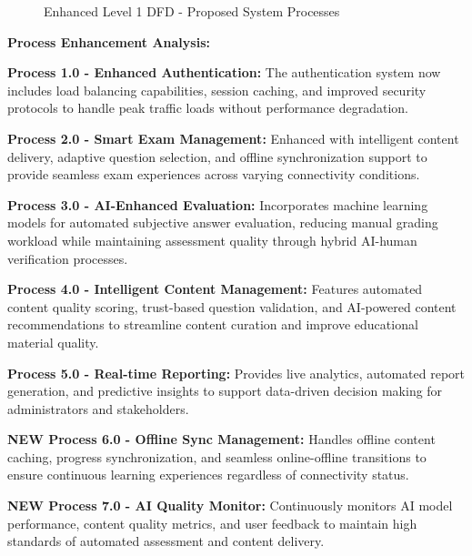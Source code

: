 \documentclass[12pt,a4paper,oneside]{book}
\begin{document}
\begin{figure}[H]
{
    }
    \caption{Enhanced Level 1 DFD - Proposed System Processes}
\end{figure}

\textbf{Process Enhancement Analysis:}

\textbf{Process 1.0 - Enhanced Authentication:} The authentication system now includes load balancing capabilities, session caching, and improved security protocols to handle peak traffic loads without performance degradation.

\textbf{Process 2.0 - Smart Exam Management:} Enhanced with intelligent content delivery, adaptive question selection, and offline synchronization support to provide seamless exam experiences across varying connectivity conditions.

\textbf{Process 3.0 - AI-Enhanced Evaluation:} Incorporates machine learning models for automated subjective answer evaluation, reducing manual grading workload while maintaining assessment quality through hybrid AI-human verification processes.

\textbf{Process 4.0 - Intelligent Content Management:} Features automated content quality scoring, trust-based question validation, and AI-powered content recommendations to streamline content curation and improve educational material quality.

\textbf{Process 5.0 - Real-time Reporting:} Provides live analytics, automated report generation, and predictive insights to support data-driven decision making for administrators and stakeholders.

\textbf{NEW Process 6.0 - Offline Sync Management:} Handles offline content caching, progress synchronization, and seamless online-offline transitions to ensure continuous learning experiences regardless of connectivity status.

\textbf{NEW Process 7.0 - AI Quality Monitor:} Continuously monitors AI model performance, content quality metrics, and user feedback to maintain high standards of automated assessment and content delivery.
\end{document}
